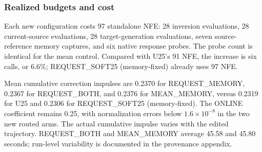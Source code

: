 \subsubsection{Realized budgets and cost}
Each new configuration costs 97 standalone NFE: 28 inversion evaluations, 28 current-source evaluations, 28 target-generation evaluations, seven source-reference memory captures, and six native response probes. The probe count is identical for the mean control. Compared with U25's 91 NFE, the increase is six calls, or 6.6\%; REQUEST\_SOFT25 (memory-fixed) already uses 97 NFE.

Mean cumulative correction impulses are 0.2370 for REQUEST\_MEMORY, 0.2367 for REQUEST\_BOTH, and 0.2376 for MEAN\_MEMORY, versus 0.2319 for U25 and 0.2306 for REQUEST\_SOFT25 (memory-fixed). The ONLINE coefficient remains 0.25, with normalization errors below $1.6\times10^{-8}$ in the two new routed arms. The actual cumulative impulse varies with the edited trajectory. REQUEST\_BOTH and MEAN\_MEMORY average 45.58 and 45.80 seconds; run-level variability is documented in the provenance appendix.
